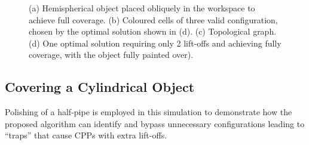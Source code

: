 \documentclass[journal]{IEEEtran}
\begin{document}
\begin{figure}[t]
\centering
{}
\caption{(a) Hemispherical object placed obliquely in the workspace to achieve full coverage. 
(b) Coloured cells of three valid configuration, chosen by the optimal solution shown in (d). %
(c) Topological graph. (d) One optimal solution requiring only 2 lift-offs and achieving fully coverage, with the object fully painted over). 
}\label{figsloped}
\end{figure}


\subsection{Covering a Cylindrical Object}
Polishing of a half-pipe is employed in this simulation to demonstrate how the proposed algorithm can identify and bypass unnecessary configurations leading to ``traps'' that cause CPPs with extra lift-offs. 
\end{document}
